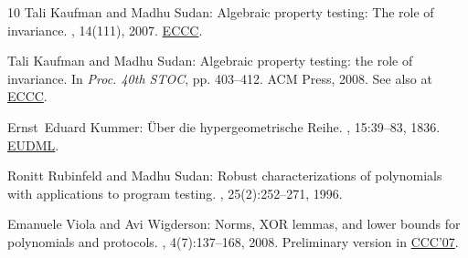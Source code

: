 \begin{thebibliography}{10}
{\sc Tali Kaufman and Madhu Sudan}: Algebraic property testing: The role of
  invariance.
, 14(111), 2007.
\newblock \href{http://eccc.hpi-web.de/report/2007/111/}{ECCC}.

{\sc Tali Kaufman and Madhu Sudan}: Algebraic property testing: the role of
  invariance.
\newblock In {\em Proc. 40th STOC}, pp. 403--412. ACM Press, 2008.
\newblock See also at \href{http://eccc.hpi-web.de/report/2007/111/}{ECCC}.
\newblock [\epfmtdoi{10.1145/1374376.1374434}]

{\sc Ernst~Eduard Kummer}: {\"U}ber die hypergeometrische {R}eihe.
, 15:39--83,
  1836.
\newblock \href{https://eudml.org/doc/146951}{EUDML}.

{\sc Ronitt Rubinfeld and Madhu Sudan}: Robust characterizations of polynomials
  with applications to program testing.
, 25(2):252--271, 1996.
\newblock [\epfmtdoi{10.1137/S0097539793255151}]

{\sc Emanuele Viola and Avi Wigderson}: Norms, {XOR} lemmas, and lower bounds
  for polynomials and protocols.
, 4(7):137--168, 2008.
\newblock Preliminary version in
  \href{http://dx.doi.org/10.1109/CCC.2007.15}{CCC'07}.

\end{thebibliography}

